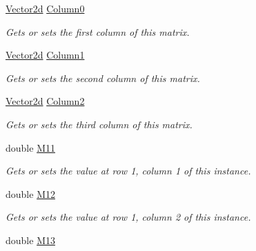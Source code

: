 \begin{DoxyCompactItemize}
\item 
\hyperlink{struct_open_t_k_1_1_vector2d}{Vector2d} \hyperlink{struct_open_t_k_1_1_matrix2x3d_ac6408e2c056007e95dce77a0609d7771}{Column0}
\begin{DoxyCompactList}\small\item\em Gets or sets the first column of this matrix. \end{DoxyCompactList}\item 
\hyperlink{struct_open_t_k_1_1_vector2d}{Vector2d} \hyperlink{struct_open_t_k_1_1_matrix2x3d_a52cb711e51ce9a5e30df86b0e4d27a1d}{Column1}
\begin{DoxyCompactList}\small\item\em Gets or sets the second column of this matrix. \end{DoxyCompactList}\item 
\hyperlink{struct_open_t_k_1_1_vector2d}{Vector2d} \hyperlink{struct_open_t_k_1_1_matrix2x3d_a30a95e42f9b0a9a0976c2b0fd1f4f9f0}{Column2}
\begin{DoxyCompactList}\small\item\em Gets or sets the third column of this matrix. \end{DoxyCompactList}\item 
double \hyperlink{struct_open_t_k_1_1_matrix2x3d_a31ab31d774da59abb47f594769b35cfc}{M11}
\begin{DoxyCompactList}\small\item\em Gets or sets the value at row 1, column 1 of this instance. \end{DoxyCompactList}\item 
double \hyperlink{struct_open_t_k_1_1_matrix2x3d_a19073ce90be167a7ae353cc2e3855e7e}{M12}
\begin{DoxyCompactList}\small\item\em Gets or sets the value at row 1, column 2 of this instance. \end{DoxyCompactList}\item 
double \hyperlink{struct_open_t_k_1_1_matrix2x3d_aa07fe96139bd686b7c95f37ed571b0c6}{M13}

\end{DoxyCompactItemize}
